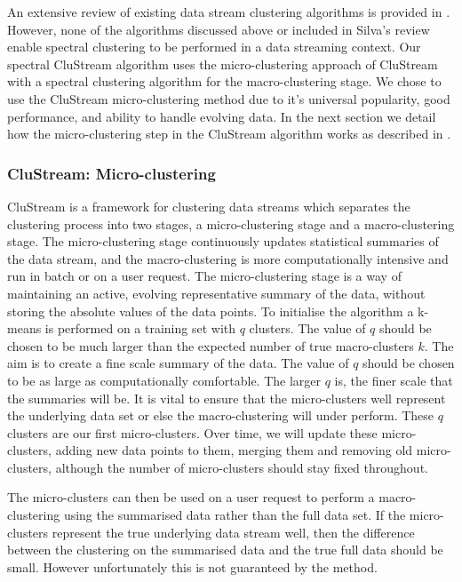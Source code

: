 An extensive review of existing data stream clustering algorithms is provided in \cite{Silva2013}. However, none of the algorithms discussed above or included in Silva's review enable spectral clustering to be performed in a data streaming context. Our spectral CluStream algorithm uses the micro-clustering approach of CluStream with a spectral clustering algorithm for the macro-clustering stage.  We chose to use the CluStream micro-clustering method due to it's universal popularity, good performance, and ability to handle evolving data.  In the next section we detail how the micro-clustering step in the CluStream algorithm works as described in \cite{Aggarwal2003}.

\subsubsection{CluStream: Micro-clustering}
\label{sec:clu_micro}

CluStream is a framework for clustering data streams which separates the clustering process into two stages, a micro-clustering stage and a macro-clustering stage. The  micro-clustering stage continuously updates statistical summaries of the data stream, and the macro-clustering is more computationally intensive and run in batch or on a user request. The micro-clustering stage is a way of maintaining an active, evolving representative summary of the data, without storing the absolute values of the data points.
To initialise the algorithm a k-means is performed on a training set with $q$ clusters. The value of $q$ should be chosen to be much larger than the expected number of true macro-clusters $k$. The aim is to create a fine scale summary of the data. The value of $q$ should be chosen to be as large as computationally comfortable. The larger $q$ is, the finer scale that the summaries will be. It is vital to ensure that the micro-clusters well represent the underlying data set or else the macro-clustering will under perform. These $q$ clusters are our first micro-clusters. Over time, we will update these micro-clusters, adding new data points to them, merging them and removing old micro-clusters, although the number of micro-clusters should stay fixed throughout. 

The micro-clusters can then be used on a user request to perform a macro-clustering using the summarised data rather than the full data set. If the micro-clusters represent the true underlying data stream well, then the difference between the clustering on the summarised data and the true full data should be small. However unfortunately this is not guaranteed by the method.

